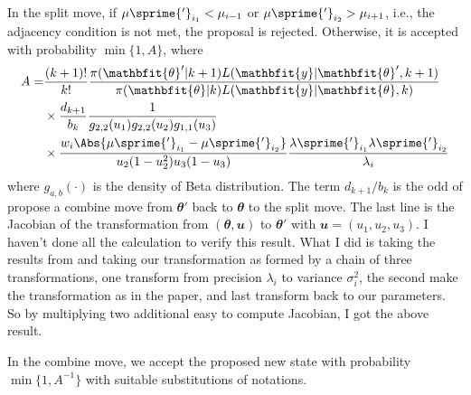\documentclass[11pt, linespread = 1.1, lines=40, lineratio = 30, bib,
fontset = Minion]{marticle}
\def\btheta{\mathbfit{\theta}}
\def\by{\mathbfit{y}}
\def\bu{\mathbfit{u}}
\begin{document}
  In the split move, if $\mu\sprime{'}_{i_1} < \mu_{i - 1}$ or
  $\mu\sprime{'}_{i_2} > \mu_{i + 1}$, i.e., the adjacency condition is not
  met, the proposal is rejected. Otherwise, it is accepted with probability
  $\min\{1, A\}$, where
  \begin{align}
    A =& \frac{(k + 1)!}{k!}
    \frac{\pi(\btheta'|k + 1)L(\by|\btheta',k + 1)}
    {\pi(\btheta|k)L(\by|\btheta,k)} \notag\\
    &\times\frac{d_{k+1}}{b_k}
    \frac{1}{g_{2,2}(u_1)g_{2,2}(u_2)g_{1,1}(u_3)} \notag\\
    &\times\frac{w_i\Abs{\mu\sprime{'}_{i_1} - \mu\sprime{'}_{i_2}}}
    {u_2(1 - u_2^2)u_3(1 - u_3)}
    \frac{\lambda\sprime{'}_{i_1}\lambda\sprime{'}_{i_2}}{\lambda_i}
  \end{align}
  where $g_{a,b}(\cdot)$ is the density of Beta distribution. The term
  $d_{k+1}/b_k$ is the odd of propose a combine move from $\btheta'$ back to
  $\btheta$ to the split move. The last line is the Jacobian of
  the transformation from $(\btheta,\bu)$ to $\btheta'$ with $\bu = (u_1, u_2,
  u_3)$. I haven't done all the calculation to verify this result. What I did
  is taking the results from \textcite{Richardson:1997ea} and taking our
  transformation as formed by a chain of three transformations, one transform
  from precision $\lambda_i$ to variance $\sigma_i^2$, the second make the
  transformation as in the paper, and last transform back to our parameters.
  So by multiplying two additional easy to compute Jacobian, I got the above
  result.

  In the combine move, we accept the proposed new state with probability
  $\min\{1,A^{-1}\}$ with suitable substitutions of notations.

  \printbibliography
\end{document}
